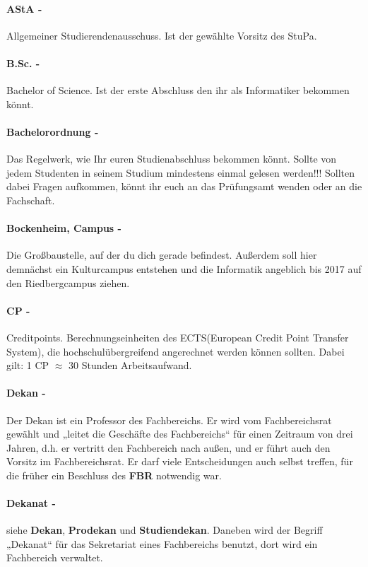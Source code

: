 \spaltenanfang
\paragraph{AStA -} \glqq Allgemeiner Studierendenausschuss\grqq . Ist der gewählte Vorsitz des StuPa.
\paragraph{B.Sc. -}\glqq Bachelor of Science\grqq . Ist der erste Abschluss den ihr als Informatiker bekommen könnt.
\paragraph{Bachelorordnung -} Das Regelwerk, wie Ihr euren Studienabschluss bekommen könnt. Sollte von jedem Studenten in seinem Studium mindestens einmal gelesen werden!!! Sollten dabei Fragen aufkommen, könnt ihr euch an das Prüfungsamt wenden oder an die Fachschaft.
\paragraph{Bockenheim, Campus -} Die Großbaustelle, auf der du dich gerade befindest. Außerdem soll hier demnächst ein Kulturcampus entstehen und die Informatik angeblich bis 2017 auf den Riedbergcampus ziehen.
\paragraph{CP -} \glqq Creditpoints\grqq . Berechnungseinheiten des ECTS(European Credit Point Transfer System), die hochschulübergreifend angerechnet werden können sollten. Dabei gilt: 1 CP $\approx$ 30 Stunden Arbeitsaufwand.
\paragraph{Dekan -} Der Dekan ist ein Professor des Fachbereichs. Er wird vom Fachbereichsrat gewählt und „leitet die Geschäfte des Fachbereichs“ für einen Zeitraum von drei Jahren, d.h. er vertritt den Fachbereich nach außen, und er führt auch den Vorsitz im Fachbereichsrat. Er darf viele Entscheidungen auch selbst treffen, für die früher ein Beschluss des \textbf{FBR} notwendig war.
\paragraph{Dekanat -} siehe \textbf{Dekan}, \textbf{Prodekan} und \textbf{Studiendekan}. Daneben wird der Begriff „Dekanat“ für das Sekretariat eines Fachbereichs benutzt, dort wird ein Fachbereich verwaltet.
